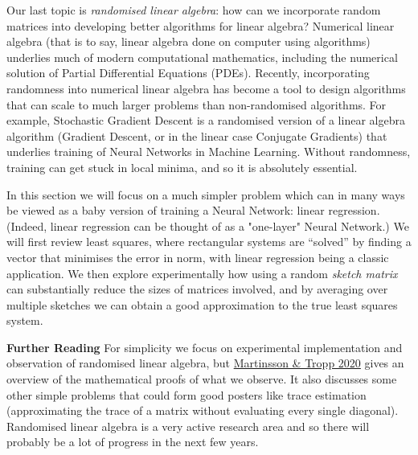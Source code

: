 Our last topic is \emph{randomised linear algebra}: how can we incorporate random matrices into developing better algorithms for linear algebra? Numerical linear algebra (that is to say, linear algebra done on computer using algorithms) underlies much of modern computational mathematics, including the numerical solution of Partial Differential Equations (PDEs). Recently, incorporating randomness into numerical linear algebra has become a tool to design algorithms that can scale to much larger problems than non-randomised algorithms. For example, Stochastic Gradient Descent is a randomised version of a linear algebra algorithm (Gradient Descent, or in the linear case Conjugate Gradients) that underlies training of Neural Networks in Machine Learning. Without randomness, training can get stuck in local minima, and so it is absolutely essential.

In this section we will focus on a much simpler problem which can in many ways be viewed as a baby version of training a Neural Network: linear regression. (Indeed, linear regression can be thought of as a "one-layer" Neural Network.)  We will first review least squares, where rectangular systems are ``solved'' by finding a vector that minimises the error in norm, with linear regression being a classic application. We then explore experimentally how using a random \emph{sketch matrix} can substantially reduce the sizes of matrices involved, and by averaging over multiple sketches we can obtain a good approximation to the true least squares system. 

\textbf{Further Reading}  For simplicity we focus on experimental implementation and observation of randomised linear algebra, but  \href{https://www.cambridge.org/core/services/aop-cambridge-core/content/view/4486926746CFF4547F42A2996C7DC09C/S0962492920000021a.pdf/div-class-title-randomized-numerical-linear-algebra-foundations-and-algorithms-div.pdf}{Martinsson \& Tropp 2020} gives  an overview of the mathematical proofs of what we observe. It also discusses some other simple problems that could form good posters like trace estimation (approximating the trace of a matrix without evaluating every single diagonal). Randomised linear algebra is a very active research area and so there will probably be a lot of progress in the next few years.

